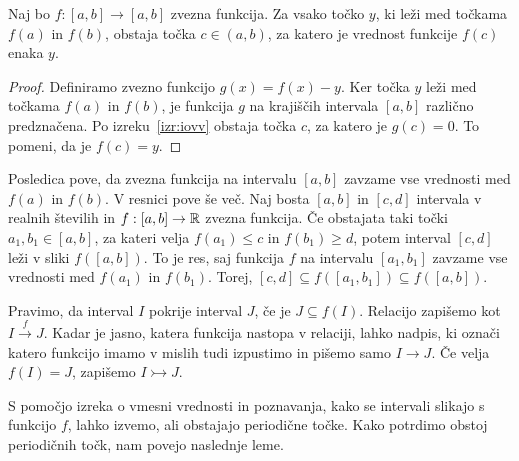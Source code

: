 \documentclass[../TG_magistrsko_delo_sections.tex]{subfiles}
\begin{document}
\begin{posledica}\label{pos:vmesnavrednost}
Naj bo $f : [a, b] \to [a, b]$ zvezna funkcija. Za vsako točko $y$, ki leži med točkama $f(a)$ in $f(b)$, obstaja točka $c \in (a, b)$, za katero je vrednost funkcije $f(c)$ enaka $y$.
\end{posledica}
\begin{proof}
Definiramo zvezno funkcijo $g(x) = f(x) - y$. Ker točka $y$ leži med točkama $f(a)$ in $f(b)$, je funkcija $g$ na krajiščih intervala $[a, b]$ različno predznačena. Po izreku~\ref{izr:iovv} obstaja točka $c$, za katero je $g(c) = 0$. To pomeni, da je $f(c) = y$.
\end{proof}
Posledica pove, da zvezna funkcija na intervalu $[a, b]$ zavzame vse vrednosti med $f(a)$ in $f(b)$. V resnici pove še več. Naj bosta $[a, b]$ in $[c, d]$ intervala v realnih številih in $f : [a, b] \to \mathbb R$ zvezna funkcija. Če obstajata taki točki $a_1, b_1 \in [a, b]$, za kateri velja $f(a_1) \leq c$ in $f(b_1) \geq d$, potem interval $[c, d]$ leži v sliki $f([a, b])$. To je res, saj funkcija $f$ na intervalu $[a_1, b_1]$ zavzame vse vrednosti med $f(a_1)$ in $f(b_1)$. Torej, $[c, d] \subseteq f([a_1, b_1]) \subseteq f([a, b])$.

\begin{definicija}\label{def:pokritja}
Pravimo, da interval $I$ pokrije interval $J$, če je $J \subseteq f(I)$. Relacijo zapišemo kot $I \xrightarrow{f} J$. Kadar je jasno, katera funkcija nastopa v relaciji, lahko nadpis, ki označi katero funkcijo imamo v mislih tudi izpustimo in pišemo samo $I \to J$. Če velja $f(I) =J$, zapišemo $I \rightarrowtail J$.
\end{definicija}
S pomočjo izreka o vmesni vrednosti in poznavanja, kako se intervali slikajo s funkcijo $f$, lahko izvemo, ali obstajajo periodične točke. Kako potrdimo obstoj periodičnih točk, nam povejo naslednje leme.
\end{document}
